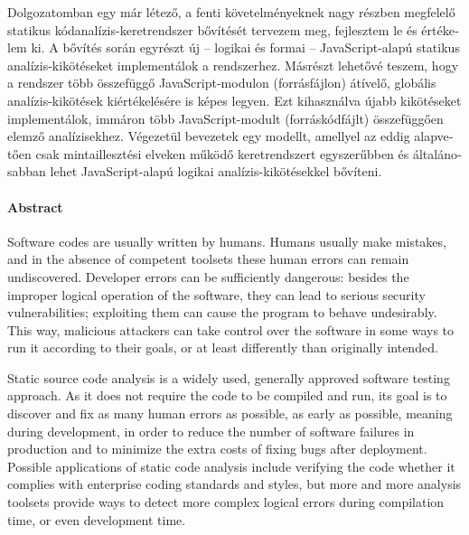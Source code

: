 \begin{otherlanguage}{magyar}
  Dolgozatomban egy már létező, a fenti követelményeknek nagy részben megfelelő statikus kódanalízis-keretrendszer bővítését tervezem meg, fejlesztem le és értékelem ki. A bővítés során egyrészt új – logikai és formai – JavaScript-alapú statikus analízis-kikötéseket implementálok a rendszerhez. Másrészt lehetővé teszem, hogy a rendszer több összefüggő JavaScript-modulon (forrásfájlon) átívelő, globális analízis-kikötések kiértékelésére is képes legyen. Ezt kihasználva újabb kikötéseket implementálok, immáron több JavaScript-modult (forráskódfájlt) összefüggően elemző analízisekhez. Végezetül bevezetek egy modellt, amellyel az eddig alapvetően csak mintaillesztési elveken működő keretrendszert egyszerűbben és általánosabban lehet JavaScript-alapú logikai analízis-kikötésekkel bővíteni.

\end{otherlanguage}

\clearpage

\paragraph*{Abstract}
{}
\thispagestyle{plain}

	Software codes are usually written by humans. Humans usually make mistakes, and in the absence of competent toolsets these human errors can remain undiscovered. Developer errors can be sufficiently dangerous: besides the improper logical operation of the software, they can lead to serious security vulnerabilities; exploiting them can cause the program to behave undesirably. This way, malicious attackers can take control over the software in some ways to run it according to their goals, or at least differently than originally intended.

	Static source code analysis is a widely used, generally approved software testing approach. As it does not require the code to be compiled and run, its goal is to discover and fix as many human errors as possible, as early as possible, meaning during development, in order to reduce the number of software failures in production and to minimize the extra costs of fixing bugs after deployment. Possible applications of static code analysis include verifying the code whether it complies with enterprise coding standards and styles, but more and more analysis toolsets provide ways to detect more complex logical errors during compilation time, or even development time.

